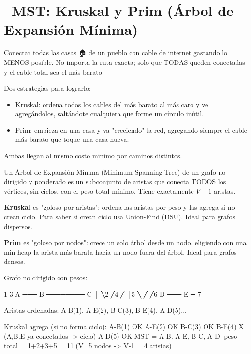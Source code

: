 \chapter[\emj{🌉}~MST: Kruskal y Prim (Árbol de Expansión Mínima)]{~MST: Kruskal y Prim (Árbol de Expansión Mínima)}

\begin{dsaquees}

Conectar todas las casas 🏠 de un pueblo con cable de internet gastando
lo MENOS posible. No importa la ruta exacta; solo que TODAS queden
conectadas y el cable total sea el más barato.

Dos estrategias para lograrlo:
\begin{itemize}
\item Kruskal: ordena todos los cables del más barato al más caro y ve
      agregándolos, saltándote cualquiera que forme un círculo inútil.
\item Prim: empieza en una casa y va "creciendo" la red, agregando
      siempre el cable más barato que toque una casa nueva.
\end{itemize}

Ambas llegan al mismo costo mínimo por caminos distintos.

\end{dsaquees}

\begin{dsaotraforma}

Un Árbol de Expansión Mínima (Minimum Spanning Tree) de un grafo no
dirigido y ponderado es un subconjunto de aristas que conecta TODOS los
vértices, sin ciclos, con el peso total mínimo. Tiene exactamente
$V-1$ aristas.

\textbf{Kruskal} es "goloso por aristas": ordena las aristas por peso y
las agrega si no crean ciclo. Para saber si crean ciclo usa Union-Find
(DSU). Ideal para grafos dispersos.

\textbf{Prim} es "goloso por nodos": crece un solo árbol desde un nodo,
eligiendo con una min-heap la arista más barata hacia un nodo fuera del
árbol. Ideal para grafos densos.

\end{dsaotraforma}

\begin{dsadiagrama}
Grafo no dirigido con pesos:

     1        3
  A ─── B ──────── C
  │  ╲2     ╱4   ╱
  │5  ╲   ╱   ╱6
  D ─── E ─
     7

Aristas ordenadas: A-B(1), A-E(2), B-C(3), B-E(4), A-D(5)...

Kruskal agrega (si no forma ciclo):
  A-B(1)  OK   A-E(2)  OK   B-C(3)  OK
  B-E(4)  X (A,B,E ya conectados -> ciclo)
  A-D(5)  OK
MST = {A-B, A-E, B-C, A-D}, peso total = 1+2+3+5 = 11
(V=5 nodos -> V-1 = 4 aristas)
\end{dsadiagrama}

